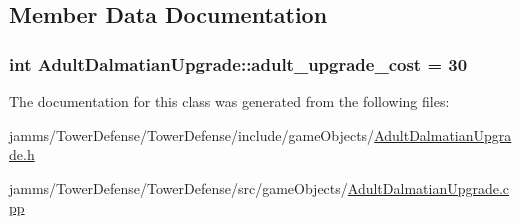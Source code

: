 \subsection{Member Data Documentation}
\hypertarget{class_adult_dalmatian_upgrade_af11683be71da82d0ce0428258cf3e20d}{
\subsubsection[{adult\+\_\+upgrade\+\_\+cost}]{\setlength{\rightskip}{0pt plus 5cm}int Adult\+Dalmatian\+Upgrade\+::adult\+\_\+upgrade\+\_\+cost = 30\hspace{0.3cm}{\ttfamily [static]}}}\label{class_adult_dalmatian_upgrade_af11683be71da82d0ce0428258cf3e20d}


The documentation for this class was generated from the following files\+:\begin{DoxyCompactItemize}
\item 
jamms/\+Tower\+Defense/\+Tower\+Defense/include/game\+Objects/\hyperlink{_adult_dalmatian_upgrade_8h}{Adult\+Dalmatian\+Upgrade.\+h}\item 
jamms/\+Tower\+Defense/\+Tower\+Defense/src/game\+Objects/\hyperlink{_adult_dalmatian_upgrade_8cpp}{Adult\+Dalmatian\+Upgrade.\+cpp}\end{DoxyCompactItemize}
